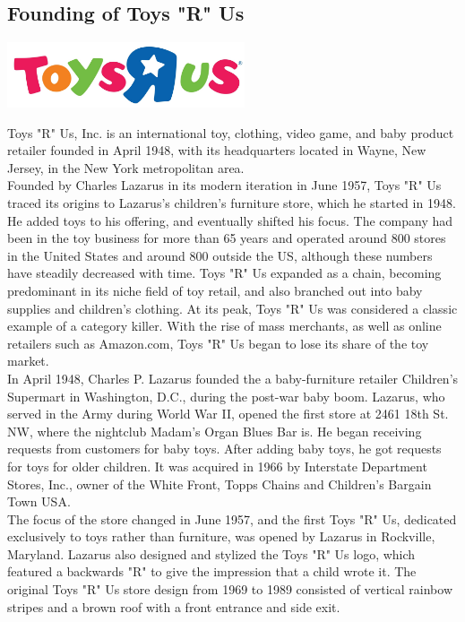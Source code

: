 \documentclass[11pt]{report}
\begin{document}
\subsection{Founding of Toys "R" Us}
\vspace{2mm}\begin{center}\includegraphics[width=7cm]{./img/toysRUsLogo.jpg}\end{center}
Toys "R" Us, Inc. is an international toy, clothing, video game, and baby product retailer founded in April 1948, with its headquarters located in Wayne, New Jersey, in the New York metropolitan area.\\ \indent Founded by Charles Lazarus in its modern iteration in June 1957, Toys "R" Us traced its origins to Lazarus's children's furniture store, which he started in 1948. He added toys to his offering, and eventually shifted his focus. The company had been in the toy business for more than 65 years and operated around 800 stores in the United States and around 800 outside the US, although these numbers have steadily decreased with time. Toys "R" Us expanded as a chain, becoming predominant in its niche field of toy retail, and also branched out into baby supplies and children's clothing. At its peak, Toys "R" Us was considered a classic example of a category killer. With the rise of mass merchants, as well as online retailers such as Amazon.com, Toys "R" Us began to lose its share of the toy market.\\ \indent In April 1948, Charles P. Lazarus founded the a baby-furniture retailer Children's Supermart in Washington, D.C., during the post-war baby boom. Lazarus, who served in the Army during World War II, opened the first store at 2461 18th St. NW, where the nightclub Madam's Organ Blues Bar is. He began receiving requests from customers for baby toys. After adding baby toys, he got requests for toys for older children. It was acquired in 1966 by Interstate Department Stores, Inc., owner of the White Front, Topps Chains and Children's Bargain Town USA.\\ \indent The focus of the store changed in June 1957, and the first Toys "R" Us, dedicated exclusively to toys rather than furniture, was opened by Lazarus in Rockville, Maryland. Lazarus also designed and stylized the Toys "R" Us logo, which featured a backwards "R" to give the impression that a child wrote it. The original Toys "R" Us store design from 1969 to 1989 consisted of vertical rainbow stripes and a brown roof with a front entrance and side exit.
\end{document}
